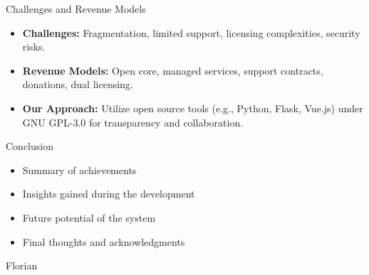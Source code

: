 \documentclass{beamer}
\begin{document}
  \begin{frame}{Challenges and Revenue Models}
    \begin{itemize}
      \item \textbf{Challenges:} Fragmentation, limited support, licensing complexities, security risks.
      \item \textbf{Revenue Models:} Open core, managed services, support contracts, donations, dual licensing.
      \item \textbf{Our Approach:} Utilize open source tools (e.g., Python, Flask, Vue.js) under GNU GPL-3.0 for transparency and collaboration.
    \end{itemize}
  \end{frame}
  


\begin{frame}{Conclusion}
  \begin{itemize}
    \item Summary of achievements
    \item Insights gained during the development
    \item Future potential of the system
    \item Final thoughts and acknowledgments
  \end{itemize}
\end{frame}

\begin{frame}{Florian}
  
\end{frame}
\end{document}
